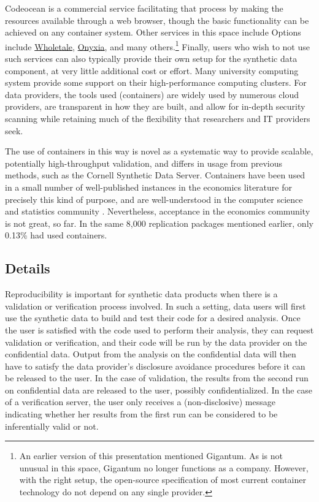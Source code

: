 \documentclass{article}
\begin{document}
Codeocean is a commercial service facilitating that process by making the resources available through a web browser, though the basic functionality can be achieved on any container system. Other services in this space include Options include \href{https://wholetale.org}{Wholetale}, \href{https://www.onyxia.sh/}{Onyxia}, and many others.\footnote{An earlier version of this presentation mentioned Gigantum. As is not unusual in this space, Gigantum no longer functions as a company. However, with the right setup, the open-source specification of most current container technology do not depend on any single provider.} Finally, users who wish to not use such services can also typically provide their own setup for the synthetic data component, at very little additional cost or effort. Many university computing system provide some support on their high-performance computing clusters. For data providers, the tools used (containers) are widely used by numerous cloud providers, are transparent in how they are built, and allow for in-depth security scanning while retaining much of the flexibility that researchers and IT providers seek.

The use of containers in this way is novel as a systematic way to provide scalable, potentially high-throughput validation, and differs in usage from previous methods, such as the Cornell Synthetic Data Server. Containers have been used in a small number of well-published instances in the economics literature for precisely this kind of purpose, and are well-understood in the computer science and statistics community \citep{boettiger_introduction_2015,moreau_containers_2023}. Nevertheless, acceptance in the economics community is not great, so far. In the same 8,000 replication packages mentioned earlier, only 0.13\% had used containers. 

\subsection{Details}


Reproducibility is important for synthetic data products when there
is a validation or verification process involved. In such a setting, data users will first use the synthetic
data to build and test their code for a desired analysis. Once the user is satisfied with the code used to
perform their analysis, they can request validation or verification, and their code will be run by the data provider on the confidential data. Output from the analysis on the confidential data will then have to satisfy the data provider's disclosure avoidance procedures before it can be released to the user. In the case of validation, the results from the second run on confidential data are released to the user, possibly confidentialized. In the case of a verification server, the user only receives a (non-disclosive) message indicating whether her results from the first run can be considered to be inferentially valid or not.
\end{document}
